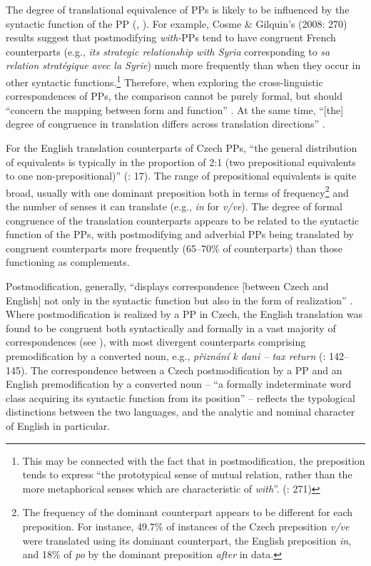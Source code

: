 \documentclass[output=paper]{langscibook}
\begin{document}
The degree of translational equivalence of PPs is likely to be influenced by the syntactic function of the PP (\citealt{CosmeGilquin2008}, \citealt{Schmied1998}). For example, Cosme \& Gilquin’s (2008: 270) results suggest that postmodifying \textit{with-}PPs tend to have congruent French counterparts (e.g., \textit{its strategic relationship with Syria} corresponding to \textit{sa relation stratégique avec la Syrie}) much more frequently than when they occur in other syntactic functions.\footnote{This may be connected with the fact that in postmodification, the preposition tends to express “the prototypical sense of mutual relation, rather than the more metaphorical senses which are characteristic of \textit{with}”. (\citealt{CosmeGilquin2008}: 271)} Therefore, when exploring the cross-linguistic correspondences of PPs, the comparison cannot be purely formal, but should “concern the mapping between form and function” \citep{Gast2012}. At the same time, “[the] degree of congruence in translation differs across translation directions” \citep[159]{Hasselgård2021}.

For the English translation counterparts of Czech PPs, “the general distribution of equivalents is typically in the proportion of 2:1 (two prepositional equivalents to one non-prepositional)” (\citealt{KlégrMalá2009}: 17). The range of prepositional equivalents is quite broad, usually with one dominant preposition both in terms of frequency\footnote{The frequency of the dominant counterpart appears to be different for each preposition. For instance, 49.7\% of instances of the Czech preposition \textit{v/ve} were translated using its dominant counterpart, the English preposition \textit{in}, and 18\% of \textit{po} by the dominant preposition \textit{after} in  data.} and the number of senses it can translate (e.g., \textit{in} for \textit{v/ve}). The degree of formal congruence of the translation counterparts appears to be related to the syntactic function of the PPs, with postmodifying and adverbial PPs being translated by congruent counterparts more frequently (65–70\% of counterparts) than those functioning as complements.

Postmodification, generally, “displays correspondence [between Czech and English] not only in the syntactic function but also in the form of realization” \citep[136]{Dušková2015}. Where postmodification is realized by a PP in Czech, the English translation was found to be congruent both syntactically and formally in a vast majority of correspondences (see ), with most divergent counterparts comprising premodification by a converted noun, e.g., \textit{přiznání k dani – tax return} (\citealt{Dušková2015}: 142–145). The correspondence between a Czech postmodification by a PP and an English premodification by a converted noun – “a formally indeterminate word class acquiring its syntactic function from its position” \citep[159]{Dušková2015} – reflects the typological distinctions between the two languages, and the analytic and nominal character of English in particular.
\end{document}

